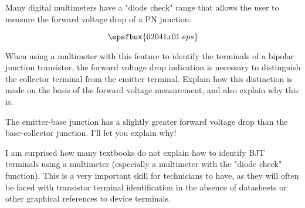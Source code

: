 

Many digital multimeters have a "diode check" range that allows the user to measure the forward voltage drop of a PN junction:

$$\epsfbox{02041x01.eps}$$

When using a multimeter with this feature to identify the terminals of a bipolar junction transistor, the forward voltage drop indication is necessary to distinguish the collector terminal from the emitter terminal.  Explain how this distinction is made on the basis of the forward voltage measurement, and also explain why this is.







The emitter-base junction has a slightly greater forward voltage drop than the base-collector junction.  I'll let you explain why!







I am surprised how many textbooks do not explain how to identify BJT terminals using a multimeter (especially a multimeter with the "diode check" function).  This is a very important skill for technicians to have, as they will often be faced with transistor terminal identification in the absence of datasheets or other graphical references to device terminals.




